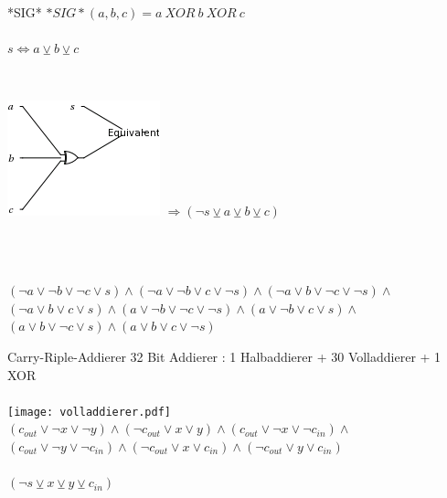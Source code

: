 \documentclass{beamer}
\begin{document}
    \begin{frame}{*SIG*}
      $ *SIG*(a, b, c) = a~XOR~b~XOR~c $\\
      ~\\
      $ s \Leftrightarrow a \veebar b \veebar c $\\
      ~\\      
      \begin{columns}[C]
        \includegraphics[scale=0.5]{sig.png}
        $ \Rightarrow (\neg s \veebar a \veebar b \veebar c) $
      \end{columns}
      ~\\
      ~\\
      $ (\neg a \vee \neg b \vee \neg c \vee s) \wedge (\neg a \vee \neg b \vee c \vee \neg s) \wedge (\neg a \vee b \vee \neg c \vee \neg s) \wedge$\\
      $ (\neg a \vee b \vee c \vee s) \wedge (a \vee \neg b \vee \neg c \vee \neg s) \wedge (a \vee \neg b \vee c \vee s) \wedge $\\
      $ (a \vee b \vee \neg c \vee s) \wedge (a \vee b \vee c \vee \neg s) $
    \end{frame}
    \begin{frame}{Carry-Riple-Addierer}
      32 Bit Addierer : 1 Halbaddierer + 30 Volladdierer + 1 XOR\\
      ~\\
      \texttt{[image: volladdierer.pdf]}\\
      $ (c_{out} \vee \neg x \vee \neg y) \wedge (\neg c_{out} \vee x \vee y) \wedge (c_{out} \vee \neg x \vee \neg c_{in}) \wedge $\\
      $ (c_{out} \vee \neg y \vee \neg c_{in}) \wedge (\neg c_{out} \vee x \vee c_{in}) \wedge (\neg c_{out} \vee y \vee c_{in}) $\\
      ~\\
      $ (\neg s \veebar x \veebar y \veebar c_{in})$\\
    \end{frame}
\end{document}
